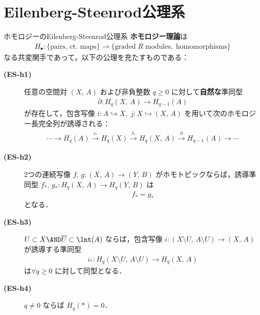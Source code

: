 \documentclass[algtopo_main]{subfiles}
\begin{document}
\section{Eilenberg-Steenrod公理系}

\begin{myaxiom}[label=ax:homology]{ホモロジーのEilenberg-Steenrod公理系}
    \textbf{ホモロジー理論}は
    \begin{align}
        H_\bullet \colon \{\text{pairs, ct. maps}\} \longrightarrow \{\text{graded}\; R\; \text{modules},\; \text{homomorphisms}\}
    \end{align}
    なる共変関手であって，以下の公理を充たすものである：
    \begin{description}
        \item[\textbf{(ES-h1)}] 任意の空間対 $(X,\, A)$ および非負整数 $q \ge 0$ に対して\textbf{自然な}準同型
        \begin{align}
            \partial \colon H_q(X,\, A) \longrightarrow H_{q-1}(A)
        \end{align}
        が存在して，包含写像 $i \colon A \hookrightarrow X,\; j \colon X \hookrightarrow (X,\, A)$ を用いて次のホモロジー長完全列が誘導される：
        \begin{align}
            \cdots \to H_q(A) \xrightarrow{i_*} H_q(X) \xrightarrow{j_*} H_q(X,\, A) \xrightarrow{\partial} H_{q-1}(A) \to \cdots 
        \end{align}
        \item[\textbf{(ES-h2)}] 2つの連続写像 $f,\, g \colon (X,\, A) \to (Y,\, B)$ がホモトピックならば，誘導準同型 $f_*,\, g_* \colon H_q(X,\, A) \to H_q(Y,\, B)$ は
        \begin{align}
            f_* = g_*
        \end{align}
        となる．
        \item[\textbf{(ES-h3)}]  $U \subset X \AND \overline{U} \subset \Int(A)$ ならば，包含写像 $i \colon (X \setminus U,\, A \setminus U) \longrightarrow (X,\, A)$ が誘導する準同型
        \begin{align}
            i_* \colon H_q(X \setminus U,\, A \setminus U) \longrightarrow H_q(X,\, A)
        \end{align}
        は$\forall q \ge 0$ に対して同型となる．
        \item[\textbf{(ES-h4)}] $q \neq 0$ ならば $H_q(*) = 0$．
    \end{description}
\end{myaxiom}
\end{document}
